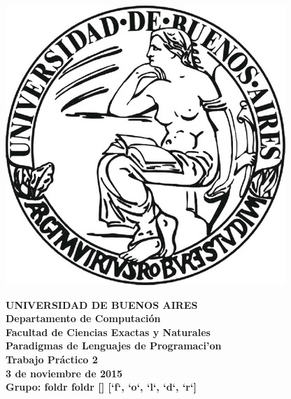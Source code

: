 \documentclass[11pt,a4paper]{article}
\begin{document}

\def\Materia{Paradigmas de Lenguajes de Programaci'on}
\def\Titulo{Trabajo Pr\'{a}ctico 2}
\def\Fecha{3 de noviembre de 2015}


\thispagestyle{empty}

\begin{center}
	\includegraphics[scale = 0.25]{imagenes/logo_uba.jpg}
\end{center}

\begin{center}
	{\textbf{\large UNIVERSIDAD DE BUENOS AIRES}}\\[1.5em]
	{\textbf{\large Departamento de Computaci\'{o}n}}\\[1.5em]
    {\textbf{\large Facultad de Ciencias Exactas y Naturales}}\\
    \vspace{35mm}
    {\LARGE\textbf{\Materia}}\\[1em]    
    \vspace{15mm}
    {\Large \textbf{\Titulo}}\\[1em]
    \vspace{15mm}
    {\textbf{\Large \Fecha}}\\
    \vspace{15mm}
	{\textbf{\Large Grupo: foldr foldr []
[`f`, `o`, `l`, `d`, `r`]}}\\
    \vspace{15mm}
    \textbf{\tablaints}
\end{center}
\end{document}
